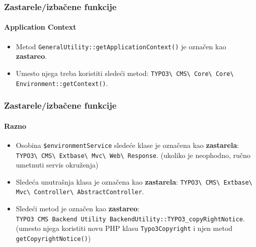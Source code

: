 
\begin{frame}[fragile]
	\frametitle{Zastarele/izbačene funkcije}
	\framesubtitle{Application Context}

	\lstset{basicstyle=\tiny\ttfamily}

	\begin{itemize}
		\item Metod \texttt{GeneralUtility::getApplicationContext()} je označen kao \textbf{zastareo}.
		\item Umesto njega treba koristiti sledeći metod:\newline
		 	\texttt{TYPO3\textbackslash
				CMS\textbackslash
				Core\textbackslash
				Core\textbackslash
				Environment::getContext()}.

	\end{itemize}

\end{frame}


\begin{frame}[fragile]
	\frametitle{Zastarele/izbačene funkcije}
	\framesubtitle{Razno}

	\lstset{basicstyle=\tiny\ttfamily}

	\begin{itemize}

		\item Osobina \texttt{\$environmentService} sledeće klase je označena kao \textbf{zastarela}:
			\texttt{TYPO3\textbackslash
				CMS\textbackslash
				Extbase\textbackslash
				Mvc\textbackslash
				Web\textbackslash
				Response}.\newline
			\smaller
				(ukoliko je neophodno, ručno umetnuti servis okruženja)
			\normalsize

		\item Sledeća unutrašnja klasa je označena kao \textbf{zastarela}:\newline
			\texttt{TYPO3\textbackslash
				CMS\textbackslash
				Extbase\textbackslash
				Mvc\textbackslash
				Controller\textbackslash
				AbstractController}.

		\item Sledeći metod je označen kao \textbf{zastareo}:\newline
			\texttt{TYPO3\
				CMS\
				Backend\
				Utility\
				BackendUtility::TYPO3\_copyRightNotice}.\newline
				\smaller
					(umesto njega koristiti novu PHP klasu \texttt{Typo3Copyright} i njen metod \texttt{getCopyrightNotice()})
				\normalsize

	\end{itemize}

\end{frame}

